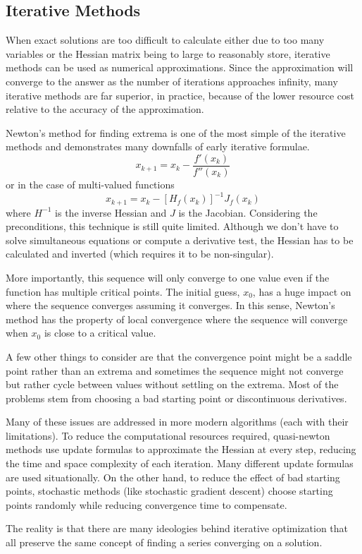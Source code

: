 \documentclass[10pt,a4paper]{report}
\begin{document}
			\subsection{Iterative Methods}
					When exact solutions are too difficult to calculate either due to too many variables or the Hessian matrix being to large
					to reasonably store, iterative methods can be used as numerical approximations. Since the approximation will converge to the
					answer as the number of iterations approaches infinity, many iterative methods are far superior, in practice, because of the lower
					resource cost relative to the accuracy of the approximation. \par
					Newton's method for finding extrema \autocite{fletcher2013practical} is one of the most simple of the iterative methods
					and demonstrates many downfalls of early iterative formulae.
					\begin{equation}
						x_{k+1} = x_k - \frac{f'(x_k)}{f''(x_k)}
						\label{eq:newtons-method-single}
					\end{equation}
					or in the case of multi-valued functions
					\begin{equation}
						x_{k+1} = x_k - [H_f(x_k)]^{-1} J_f(x_k)
						\label{eq:newtons-method-multi}
					\end{equation}
					where $H^{-1}$ is the inverse Hessian and $J$ is the Jacobian. Considering the preconditions, this technique is still quite limited.
					Although we don't have to solve simultaneous equations or compute a derivative test, the Hessian has to be calculated and inverted (which requires it to be non-singular). \par
					More importantly, this sequence will only converge to one value even if the function has multiple critical points. The initial guess, $x_0$,
					has a huge impact on where the sequence converges assuming it converges. In this sense, Newton's method has the
					property of local convergence where the sequence will converge when $x_0$ is close to a critical value. \par
					A few other things to consider are that the convergence point might be a saddle point rather than an extrema and sometimes the sequence might
					not converge but rather cycle between values without settling on the extrema. Most of the problems stem from choosing a bad starting point or
					discontinuous derivatives. \par
					Many of these issues are addressed in more modern algorithms (each with their limitations).
					To reduce the computational resources required, quasi-newton methods use update formulas to approximate the Hessian at every step, reducing the time and space complexity of each iteration.
					Many different update formulas are used situationally. On the other hand, to reduce the effect of bad starting points, stochastic methods (like stochastic gradient descent)
					choose starting points randomly while reducing convergence time to compensate. \par
					The reality is that there are many ideologies behind iterative optimization that
					all preserve the same concept of finding a series converging on a solution.

\listoffigures
\printbibliography[title=References]
\end{document}
